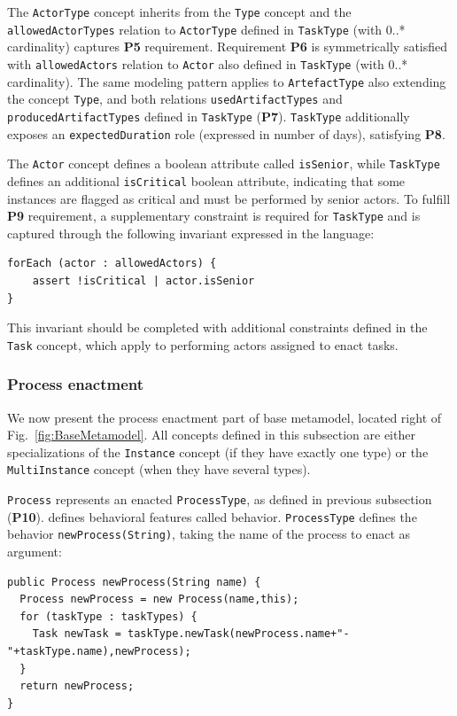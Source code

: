 The \texttt{ActorType} concept inherits from the \texttt{Type} concept and the
\texttt{allowedActorTypes} relation to \texttt{ActorType} defined in
\texttt{TaskType} (with 0..* cardinality) captures \textbf{P5} requirement.
Requirement \textbf{P6} is symmetrically satisfied with \texttt{allowedActors}
relation to \texttt{Actor} also defined in \texttt{TaskType} (with 0..*
cardinality). The same modeling pattern applies to \texttt{ArtefactType} also
extending the concept \texttt{Type}, and both relations
\texttt{usedArtifactTypes} and \texttt{producedArtifactTypes} defined in
\texttt{TaskType} (\textbf{P7}). \texttt{TaskType} additionally exposes an
\texttt{expectedDuration} role (expressed in number of days), satisfying
\textbf{P8}.

The \texttt{Actor} concept defines a boolean attribute called
\texttt{isSenior}, while \texttt{TaskType} defines an additional
\texttt{isCritical} boolean attribute, indicating that some instances are
flagged as critical and must be performed by senior actors. To fulfill
\textbf{P9} requirement, a supplementary constraint is required for
\texttt{TaskType} and is captured through the following invariant expressed in
the \FML language:

\begin{lstlisting}
forEach (actor : allowedActors) {
    assert !isCritical | actor.isSenior
}
\end{lstlisting}

This invariant should be completed with additional constraints defined in the
\texttt{Task} concept, which apply to performing actors assigned to enact
tasks.

\subsubsection{Process enactment}
\label{sec:ProcessEnactment}
We now present the process enactment part of base metamodel, located right of
Fig.~\ref{fig:BaseMetamodel}. All concepts defined in this subsection are
either specializations of the \texttt{Instance} concept (if they have exactly
one type) or the \texttt{MultiInstance} concept (when they have several types).

\texttt{Process} represents an enacted \texttt{ProcessType}, as defined in
previous subsection (\textbf{P10}). \FML defines behavioral features called
behavior. \texttt{ProcessType} defines the behavior
\texttt{newProcess(String)}, taking the name of the process to enact as
argument:

\begin{lstlisting}
public Process newProcess(String name) {
  Process newProcess = new Process(name,this);
  for (taskType : taskTypes) {
    Task newTask = taskType.newTask(newProcess.name+"-"+taskType.name),newProcess);
  }
  return newProcess;
}
\end{lstlisting}

